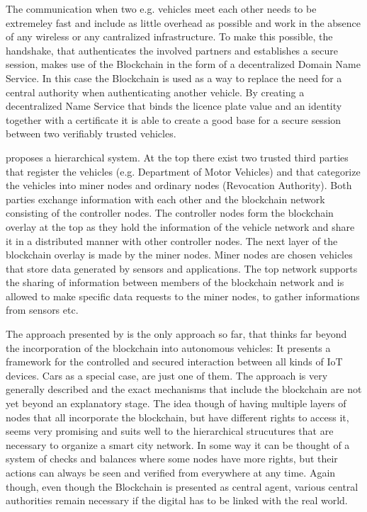 The communication when two e.g. vehicles meet each other needs to be extremeley fast and include as little overhead as possible and work in the absence of any wireless or any cantralized infrastructure. To make this possible, the handshake, that authenticates the involved partners and establishes a secure session, makes use of the Blockchain in the form of a decentralized Domain Name Service.
In this case the Blockchain is used as a way to replace the need for a central authority when authenticating another vehicle. By creating a decentralized Name Service that binds the licence plate value and an identity together with a certificate it is able to create a good base for a secure session between two verifiably trusted vehicles.

\citeauthor{Sharma2017} proposes a hierarchical system. At the top there exist two trusted third parties that register the vehicles (e.g. Department of Motor Vehicles) and that categorize the vehicles into miner nodes and ordinary nodes (Revocation Authority). Both parties exchange information with each other and the blockchain network consisting of the controller nodes. The controller nodes form the blockchain overlay at the top as they hold the information of the vehicle network and share it in a distributed manner with other controller nodes.
The next layer of the blockchain overlay is made by the miner nodes. Miner nodes are chosen vehicles that store data generated by sensors and applications. The top network supports the sharing of information between members of the blockchain network and is allowed to make specific data requests to the miner nodes, to gather informations from sensors etc.

The approach presented by \citeauthor{Sharma2017} is the only approach so far, that thinks far beyond the incorporation of the blockchain into autonomous vehicles: It presents a framework for the controlled and secured interaction between all kinds of IoT devices. Cars as a special case, are just one of them. The approach is very generally described and the exact mechanisms that include the blockchain are not yet beyond an explanatory stage.
The idea though of having multiple layers of nodes that all incorporate the blockchain, but have different rights to access it, seems very promising and suits well to the hierarchical strucutures that are necessary to organize a smart city network. In some way it can be thought of a system of checks and balances where some nodes have more rights, but their actions can always be seen and verified from everywhere at any time.
Again though, even though the Blockchain is presented as central agent, various central authorities remain necessary if the digital has to be linked with the real world.


